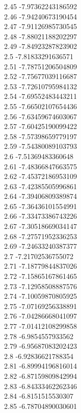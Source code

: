 {2.45	-7.97362243186592\\
2.46	-7.94240673190454\\
2.47	-7.91126985730545\\
2.48	-7.88021188202297\\
2.49	-7.84923287823902\\
2.5	-7.81833291636571\\
2.51	-7.78751206504809\\
2.52	-7.75677039116687\\
2.53	-7.72610795984132\\
2.54	-7.69552483443211\\
2.55	-7.66502107654436\\
2.56	-7.63459674603067\\
2.57	-7.60425190099422\\
2.58	-7.57398659779197\\
2.59	-7.54380089103793\\
2.6	-7.51369483360648\\
2.61	-7.48366847663575\\
2.62	-7.45372186953109\\
2.63	-7.42385505996861\\
2.64	-7.39406809389874\\
2.65	-7.36436101554991\\
2.66	-7.33473386743226\\
2.67	-7.30518669034147\\
2.68	-7.27571952336253\\
2.69	-7.24633240387377\\
2.7	-7.21702536755072\\
2.71	-7.18779844837026\\
2.72	-7.15865167861465\\
2.73	-7.12958508887576\\
2.74	-7.10059870805925\\
2.75	-7.07169256338891\\
2.76	-7.04286668041097\\
2.77	-7.01412108299858\\
2.78	-6.9854557933562\\
2.79	-6.95687083202423\\
2.8	-6.92836621788354\\
2.81	-6.89994196816014\\
2.82	-6.87159809842994\\
2.83	-6.84333462262346\\
2.84	-6.8151515530307\\
2.85	-6.78704890030601\\
}
